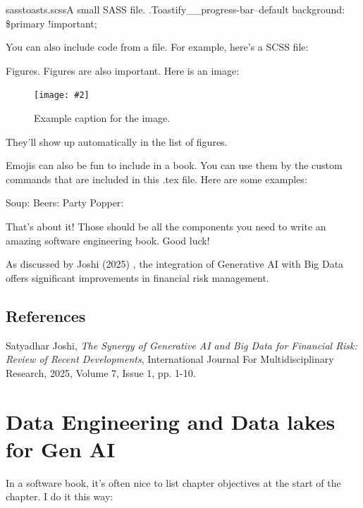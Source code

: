 \documentclass[a4paper,headinclude=on,footinclude=on,12pt,oneside]{scrbook}
\newcommand{\standardfigure}[3]{\begin{figure}[H]\begin{center}\texttt{[image: \#2]}\caption{#3}\label{fig:#2}\end{center}\end{figure}}
\begin{document}
\begin{codeInput}{sass}{toasts.scss}{A small SASS file.}
.Toastify__progress-bar--default {
  background: \$primary !important;
}
\end{codeInput}

You can also include code from a file. For example, here's a SCSS file:




Figures. Figures are also important. Here is an image:

\standardfigure{\textwidth/2}{folder-one/example}{Example caption for the image.}

They'll show up automatically in the list of figures.


Emojis can also be fun to include in a book. You can use them by the custom commands that are included in this .tex file. Here are some examples:

Soup: \soup
Beers: \beers
Party Popper: \partypopper

That's about it! Those should be all the components you need to write an amazing software engineering book. Good luck!


As discussed by Joshi (2025) \cite{Joshi2025}, the integration of Generative AI with Big Data offers significant improvements in financial risk management.

\section*{References}
\begin{thebibliography}{9}
	Satyadhar Joshi,
	\textit{The Synergy of Generative AI and Big Data for Financial Risk: Review of Recent Developments},
	International Journal For Multidisciplinary Research, 2025, Volume 7, Issue 1, pp. 1-10.
\end{thebibliography}





\chapter{Data Engineering and Data lakes for Gen AI  }
In a software book, it's often nice to list chapter objectives at the start of the chapter. I do it this way:
\end{document}
